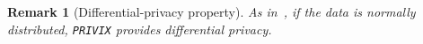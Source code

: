\documentclass[twoside]{article}
\newcommand{\todo}[1]{\textcolor{red}{ToDo:~#1}}
\newtheorem{remark}{Remark}
\newtheorem{assumption}{Assumption}
\newtheorem{definition}{Definition}
\begin{document}

\begin{remark}[Differential-privacy property]
As in~\cite{li2019privacy}, if the data is normally distributed, \texttt{PRIVIX} provides differential privacy.  
\end{remark}



 


\end{document}
